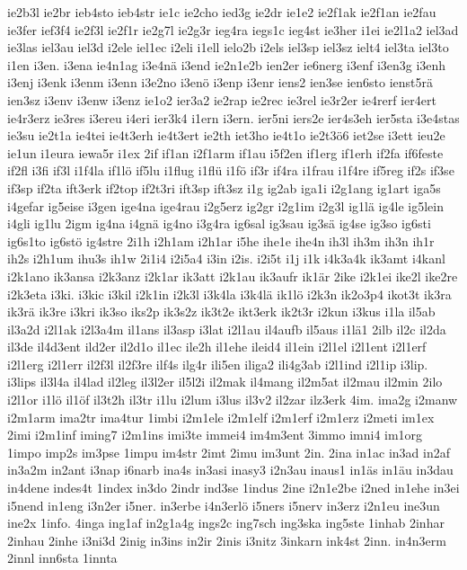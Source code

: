{ie2b3l
ie2br
ieb4sto
ieb4str
ie1c
ie2cho
ied3g
ie2dr
ie1e2
ie2f1ak
ie2f1an
ie2fau
ie3fer
ief3f4
ie2f3l
ie2f1r
ie2g7l
ie2g3r
ieg4ra
iegs1c
ieg4st
ie3her
i1ei
ie2l1a2
iel3ad
ie3las
iel3au
iel3d
i2ele
iel1ec
i2eli
i1ell
ielo2b
i2els
iel3sp
iel3sz
ielt4
iel3ta
iel3to
i1en
i3en.
i3ena
ie4n1ag
i3e4nä
i3end
ie2n1e2b
ien2er
ie6nerg
i3enf
i3en3g
i3enh
i3enj
i3enk
i3enm
i3enn
i3e2no
i3enö
i3enp
i3enr
iens2
ien3se
ien6sto
ienst5rä
ien3sz
i3env
i3enw
i3enz
ie1o2
ier3a2
ie2rap
ie2rec
ie3rel
ie3r2er
ie4rerf
ier4ert
ie4r3erz
ie3res
i3ereu
i4eri
ier3k4
i1ern
i3ern.
ier5ni
iers2e
ier4s3eh
ier5sta
i3e4stas
ie3su
ie2t1a
ie4tei
ie4t3erh
ie4t3ert
ie2th
iet3ho
ie4t1o
ie2t3ö6
iet2se
i3ett
ieu2e
ie1un
i1eura
iewa5r
i1ex
2if
if1an
i2f1arm
if1au
i5f2en
if1erg
if1erh
if2fa
if6feste
if2fl
i3fi
if3l
i1f4la
if1lö
if5lu
i1flug
i1flü
i1fö
if3r
if4ra
i1frau
i1f4re
if5reg
if2s
if3se
if3sp
if2ta
ift3erk
if2top
if2t3ri
ift3sp
ift3sz
i1g
ig2ab
iga1i
i2g1ang
ig1art
iga5s
i4gefar
ig5eise
i3gen
ige4na
ige4rau
i2g5erz
ig2gr
i2g1im
i2g3l
ig1lä
ig4le
ig5lein
i4gli
ig1lu
2igm
ig4na
i4gnä
ig4no
i3g4ra
ig6sal
ig3sau
ig3sä
ig4se
ig3so
ig6sti
ig6s1to
ig6stö
ig4stre
2i1h
i2h1am
i2h1ar
i5he
ihe1e
ihe4n
ih3l
ih3m
ih3n
ih1r
ih2s
i2h1um
ihu3s
ih1w
2i1i4
i2i5a4
i3in
i2is.
i2i5t
i1j
i1k
i4k3a4k
ik3amt
i4kanl
i2k1ano
ik3ansa
i2k3anz
i2k1ar
ik3att
i2k1au
ik3aufr
ik1är
2ike
i2k1ei
ike2l
ike2re
i2k3eta
i3ki.
i3kic
i3kil
i2k1in
i2k3l
i3k4la
i3k4lä
ik1lö
i2k3n
ik2o3p4
ikot3t
ik3ra
ik3rä
ik3re
i3kri
ik3so
iks2p
ik3s2z
ik3t2e
ikt3erk
ik2t3r
i2kun
i3kus
i1la
il5ab
il3a2d
i2l1ak
i2l3a4m
il1ans
il3asp
i3lat
i2l1au
il4aufb
il5aus
i1lä1
2ilb
il2c
il2da
il3de
il4d3ent
ild2er
il2d1o
il1ec
ile2h
il1ehe
ileid4
il1ein
i2l1el
i2l1ent
i2l1erf
i2l1erg
i2l1err
il2f3l
il2f3re
ilf4s
ilg4r
ili5en
iliga2
ili4g3ab
i2l1ind
i2l1ip
i3lip.
i3lips
il3l4a
il4lad
il2leg
il3l2er
il5l2i
il2mak
il4mang
il2m5at
il2mau
il2min
2ilo
i2l1or
i1lö
il1öf
il3t2h
il3tr
i1lu
i2lum
i3lus
il3v2
il2zar
ilz3erk
4im.
ima2g
i2manw
i2m1arm
ima2tr
ima4tur
1imbi
i2m1ele
i2m1elf
i2m1erf
i2m1erz
i2meti
im1ex
2imi
i2m1inf
iming7
i2m1ins
imi3te
immei4
im4m3ent
3immo
imni4
im1org
1impo
imp2s
im3pse
1impu
im4str
2imt
2imu
im3unt
2in.
2ina
in1ac
in3ad
in2af
in3a2m
in2ant
i3nap
i6narb
ina4s
in3asi
inasy3
i2n3au
inaus1
in1äs
in1äu
in3dau
in4dene
indes4t
1index
in3do
2indr
ind3se
1indus
2ine
i2n1e2be
i2ned
in1ehe
in3ei
i5nend
in1eng
i3n2er
i5ner.
in3erbe
i4n3erlö
i5ners
i5nerv
in3erz
i2n1eu
ine3un
ine2x
1info.
4inga
ing1af
in2g1a4g
ings2c
ing7sch
ing3ska
ing5ste
1inhab
2inhar
2inhau
2inhe
i3ni3d
2inig
in3ins
in2ir
2inis
i3nitz
3inkarn
ink4st
2inn.
in4n3erm
2innl
inn6sta
1innta
}
